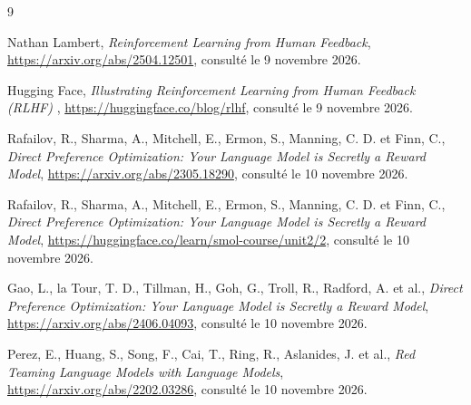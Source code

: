 \documentclass[12pt,a4paper]{report}
\begin{document}
\begin{thebibliography}{9}

Nathan Lambert,
\textit{Reinforcement Learning from Human Feedback},
\url{https://arxiv.org/abs/2504.12501},
consulté le 9 novembre 2026.

Hugging Face,
\textit{Illustrating Reinforcement Learning from Human Feedback (RLHF) },
\url{https://huggingface.co/blog/rlhf},
consulté le 9 novembre 2026.

Rafailov, R., Sharma, A., Mitchell, E., Ermon, S., Manning, C. D. et Finn, C.,
\textit{Direct Preference Optimization: Your Language Model is Secretly a Reward Model},
\url{https://arxiv.org/abs/2305.18290},
consulté le 10 novembre 2026.

Rafailov, R., Sharma, A., Mitchell, E., Ermon, S., Manning, C. D. et Finn, C.,
\textit{Direct Preference Optimization: Your Language Model is Secretly a Reward Model},
\url{https://huggingface.co/learn/smol-course/unit2/2},
consulté le 10 novembre 2026.

Gao, L., la Tour, T. D., Tillman, H., Goh, G., Troll, R., Radford, A. et al.,
\textit{Direct Preference Optimization: Your Language Model is Secretly a Reward Model},
\url{https://arxiv.org/abs/2406.04093},
consulté le 10 novembre 2026.

Perez, E., Huang, S., Song, F., Cai, T., Ring, R., Aslanides, J. et al.,
\textit{Red Teaming Language Models with Language Models},
\url{https://arxiv.org/abs/2202.03286},
consulté le 10 novembre 2026.

\end{thebibliography}





\end{document}
